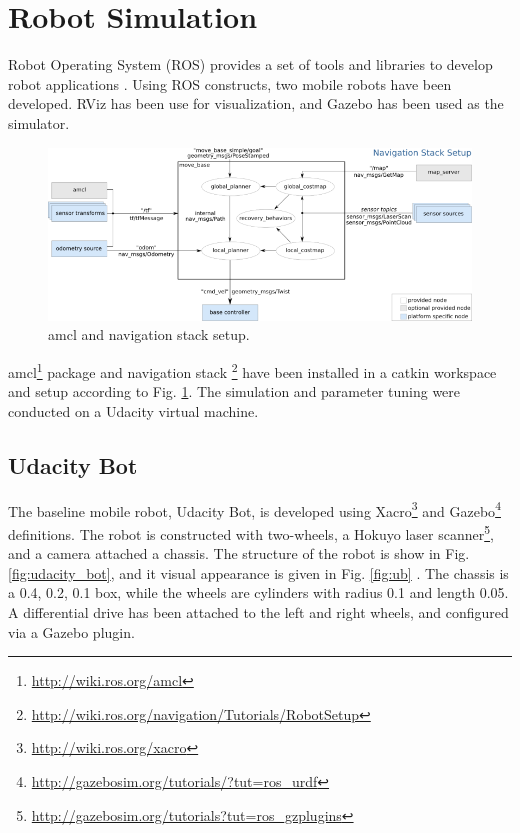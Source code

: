 \documentclass[10pt,journal,compsoc]{IEEEtran}
\begin{document}
%

\section{Robot Simulation}

Robot Operating System (ROS) provides a set of tools and libraries to develop robot applications \cite{288}. Using ROS constructs, two mobile robots have been developed.  RViz has been use for visualization, and Gazebo has been used as the simulator. 

\begin{figure}[thpb]
      \centering
      \includegraphics[width=\linewidth]{misc/overview_tf_small.png}
      \caption{amcl and navigation stack setup.}
      \label{fig:nav_stack}
\end{figure}

amcl\footnote{\url{http://wiki.ros.org/amcl}} package and navigation stack \footnote{\url{http://wiki.ros.org/navigation/Tutorials/RobotSetup}} have been installed in a catkin workspace and setup according to Fig. \ref{fig:nav_stack}. The simulation and parameter tuning were conducted on a Udacity virtual machine.

\subsection{Udacity Bot}
\label{subsec:udacity_bot}

The baseline mobile robot, Udacity Bot, is developed using Xacro\footnote{\url{http://wiki.ros.org/xacro}} and Gazebo\footnote{\url{http://gazebosim.org/tutorials/?tut=ros_urdf}} definitions. The robot is constructed  with two-wheels, a Hokuyo laser scanner\footnote{\url{http://gazebosim.org/tutorials?tut=ros_gzplugins}}, and a camera attached a chassis. The structure of the robot is show in Fig. \ref{fig:udacity_bot}, and it visual appearance is given in Fig. \ref{fig:ub}  . The chassis is a 0.4, 0.2, 0.1 box, while the wheels are cylinders with radius 0.1 and length 0.05.  A differential drive has been attached to the left and right wheels, and configured via a Gazebo plugin. 
\end{document}
